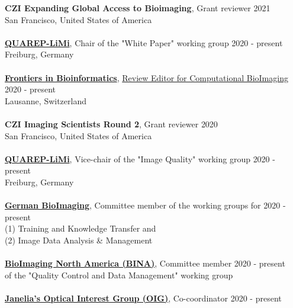 \documentclass[margin,line]{res}
\begin{document}
\begin{resume}
{\bf CZI Expanding Global Access to Bioimaging}, Grant reviewer \hfill {2021}\\
San Francisco, United States of America\\
\vspace*{-3mm}\\
{\bf \href{https://quarep.org/}{QUAREP-LiMi}}, Chair of the "White Paper" working group \hfill {2020 - present}\\
Freiburg, Germany\\
\vspace*{-3mm}\\
{\bf  \href{https://www.frontiersin.org/journals/bioinformatics/sections/computational-bioimaging}{ Frontiers in Bioinformatics}},  \href{https://www.frontiersin.org/journals/bioinformatics/sections/computational-bioimaging}{Review Editor for Computational BioImaging} \hfill {2020 - present}\\
Lausanne, Switzerland\\
\vspace*{-3mm}\\
{\bf CZI Imaging Scientists Round 2}, Grant reviewer \hfill {2020}\\
San Francisco, United States of America\\
\vspace*{-3mm}\\
{\bf \href{https://quarep.org/}{QUAREP-LiMi}}, Vice-chair of the "Image Quality" working group  \hfill {2020 - present}\\
Freiburg, Germany\\
\vspace*{-3mm}\\
{\bf \href{https://www.gerbi-gmb.de/}{German BioImaging}}, Committee member of the working groups for \hfill {2020 - present}\\
 (1)  Training and Knowledge Transfer and\\
(2) Image Data Analysis \& Management\\
\vspace*{-3mm}\\
{\bf \href{https://www.bioimagingna.org/}{BioImaging North America (BINA)}}, Committee member \hfill {2020 - present}\\
of the "Quality Control and Data Management" working group\\
\vspace*{-3mm}\\
{\bf \href{https://www.janelia.org/content/optical-interest-group}{Janelia's Optical Interest Group (OIG)}}, Co-coordinator \hfill {2020 - present}\\

\end{resume}
\end{document}
